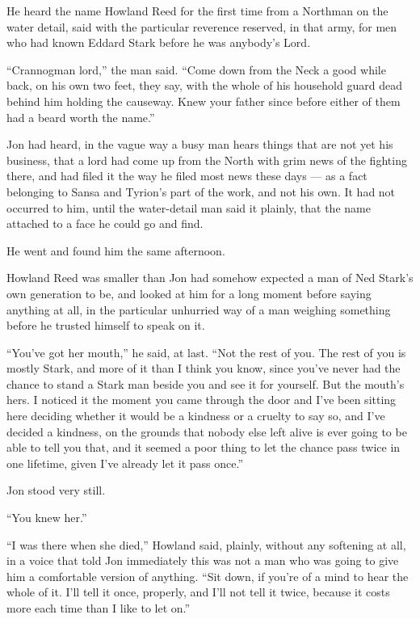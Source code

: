 \sceneBreak

He heard the name Howland Reed for the first time from a Northman on the water detail, said with the particular reverence reserved, in that army, for men who had known Eddard Stark before he was anybody’s Lord.

“Crannogman lord,” the man said. “Come down from the Neck a good while back, on his own two feet, they say, with the whole of his household guard dead behind him holding the causeway. Knew your father since before either of them had a beard worth the name.”

Jon had heard, in the vague way a busy man hears things that are not yet his business, that a lord had come up from the North with grim news of the fighting there, and had filed it the way he filed most news these days — as a fact belonging to Sansa and Tyrion’s part of the work, and not his own. It had not occurred to him, until the water-detail man said it plainly, that the name attached to a face he could go and find.

He went and found him the same afternoon.

\sceneBreak

Howland Reed was smaller than Jon had somehow expected a man of Ned Stark’s own generation to be, and looked at him for a long moment before saying anything at all, in the particular unhurried way of a man weighing something before he trusted himself to speak on it.

“You’ve got her mouth,” he said, at last. “Not the rest of you. The rest of you is mostly Stark, and more of it than I think you know, since you’ve never had the chance to stand a Stark man beside you and see it for yourself. But the mouth’s hers. I noticed it the moment you came through the door and I’ve been sitting here deciding whether it would be a kindness or a cruelty to say so, and I’ve decided a kindness, on the grounds that nobody else left alive is ever going to be able to tell you that, and it seemed a poor thing to let the chance pass twice in one lifetime, given I’ve already let it pass once.”

Jon stood very still.

“You knew her.”

“I was there when she died,” Howland said, plainly, without any softening at all, in a voice that told Jon immediately this was not a man who was going to give him a comfortable version of anything. “Sit down, if you’re of a mind to hear the whole of it. I’ll tell it once, properly, and I’ll not tell it twice, because it costs more each time than I like to let on.”

